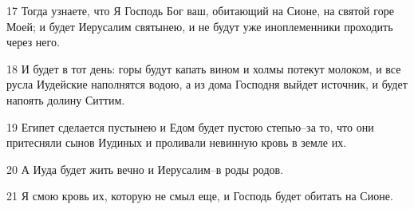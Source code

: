\par 17 Тогда узнаете, что Я Господь Бог ваш, обитающий на Сионе, на святой горе Моей; и будет Иерусалим святынею, и не будут уже иноплеменники проходить через него.
\par 18 И будет в тот день: горы будут капать вином и холмы потекут молоком, и все русла Иудейские наполнятся водою, а из дома Господня выйдет источник, и будет напоять долину Ситтим.
\par 19 Египет сделается пустынею и Едом будет пустою степью--за то, что они притесняли сынов Иудиных и проливали невинную кровь в земле их.
\par 20 А Иуда будет жить вечно и Иерусалим--в роды родов.
\par 21 Я смою кровь их, которую не смыл еще, и Господь будет обитать на Сионе.


